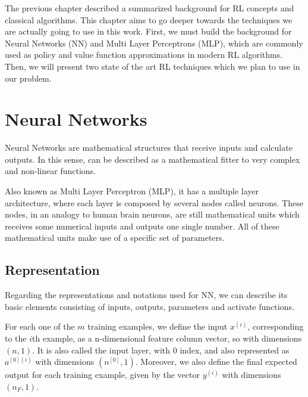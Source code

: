 
The previous chapter described a summarized background for RL concepts and classical algorithms. This chapter aims to go deeper towards the techniques we are actually going to use in this work. First, we must build the background for Neural Networks (NN) and Multi Layer Perceptrons (MLP), which are commonly used as policy and value function approximations in modern RL algorithms. Then, we will present two state of the art RL techniques which we plan to use in our problem.

\section{Neural Networks}

Neural Networks are mathematical structures that receive inputs and calculate outputs. In this sense, can be described as a mathematical fitter to very complex and non-linear functions.

Also known as Multi Layer Perceptron (MLP), it has a multiple layer architecture, where each layer is composed by several nodes called neurons. These nodes, in an analogy to human brain neurons, are still mathematical units which receives some numerical inputs and outputs one single number. All of these mathematical units make use of a specific set of parameters.

\subsection{Representation}

Regarding the representations and notations used for NN, we can describe its basic elements consisting of inputs, outputs, parameters and activate functions.

For each one of the $m$ training examples, we define the input $x^{(i)}$, corresponding to the $i$th example, as a n-dimensional feature column vector, so with dimensions $(n,1)$. It is also called the input layer, with $0$ index, and also represented as $a^{[0](i)}$ with dimensions $(n^{[0]},1)$. Moreover, we also define the final expected output for each training example, given by the vector $y^{(i)}$ with dimensions $(n_F,1)$.

